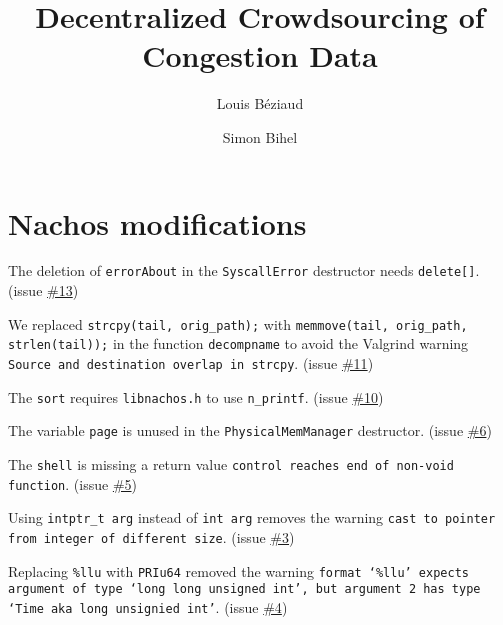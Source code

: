 \documentclass[a4paper]{article}
\title{Decentralized Crowdsourcing of Congestion Data}
\author{Louis Béziaud \and Simon Bihel}
\begin{document}
\maketitle

\section{Nachos modifications}

The deletion of \texttt{errorAbout} in the \texttt{SyscallError} destructor needs \texttt{delete[]}. (issue \href{https://github.com/lbeziaud/sgmtp/issues/13}{\#13})

We replaced \texttt{strcpy(tail, orig\_path);} with \texttt{memmove(tail, orig\_path, strlen(tail));} in the function \texttt{decompname} to avoid the Valgrind warning \texttt{Source and destination overlap in strcpy}. (issue \href{https://github.com/lbeziaud/sgmtp/issues/11}{\#11})

The \texttt{sort} requires \texttt{libnachos.h} to use \texttt{n\_printf}. (issue \href{https://github.com/lbeziaud/sgmtp/issues/10}{\#10})

The variable \texttt{page} is unused in the \texttt{PhysicalMemManager} destructor. (issue \href{https://github.com/lbeziaud/sgmtp/issues/6}{\#6})

The \texttt{shell} is missing a return value \texttt{control reaches end of non-void function}. (issue \href{https://github.com/lbeziaud/sgmtp/issues/5}{\#5})

Using \texttt{intptr\_t arg} instead of \texttt{int arg} removes the warning \texttt{cast to pointer from integer of different size}. (issue \href{https://github.com/lbeziaud/sgmtp/issues/3}{\#3})

Replacing \texttt{\%llu} with \texttt{PRIu64} removed the warning \texttt{format ‘\%llu’ expects argument of type ‘long long unsigned int’, but argument 2 has type ‘Time {aka long unsignied int}’}. (issue \href{https://github.com/lbeziaud/sgmtp/issues/4}{\#4})
\end{document}
